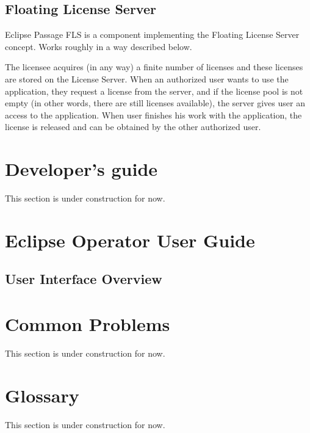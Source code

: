 \documentclass[12pt]{report}
\begin{document}
\section*{Floating License Server}

Eclipse Passage FLS is a component implementing the Floating License Server concept. Works roughly in a way described below.

The licensee acquires (in any way) a finite number of licenses and these licenses are stored on the License Server. When an authorized user wants to use the application,
they request a license from the server, and if the license pool is not empty (in other words, there are still licenses available), the server gives user an access to the
application. When user finishes his work with the application, the license is released and can be obtained by the other authorized user.

\chapter*{Developer's guide}

This section is under construction for now.

\chapter*{Eclipse Operator User Guide}

\section*{User Interface Overview}



\chapter*{Common Problems}

This section is under construction for now.

\chapter*{Glossary}

This section is under construction for now.
\end{document}

